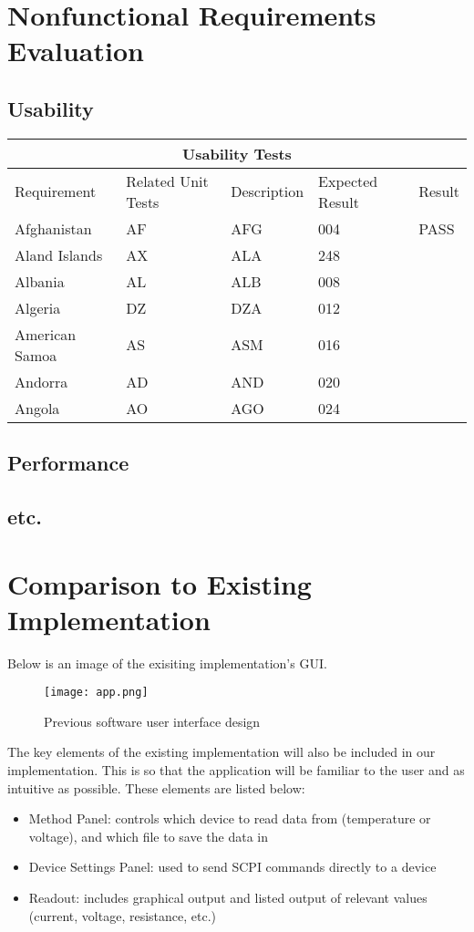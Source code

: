 \documentclass[12pt, titlepage]{article}
\begin{document}
\section{Nonfunctional Requirements Evaluation}

\subsection{Usability}
\begin{tabular}{ |p{3cm}||p{3cm}|p{3cm}|p{3cm}|p{2cm}| }
  \hline
  \multicolumn{5}{|c|}{Usability Tests} \\
  \hline
  Requirement & Related Unit Tests & Description & Expected Result & Result\\
  \hline
  Afghanistan   & AF    &AFG&   004 & PASS\\
  Aland Islands&   AX  & ALA   &248 &\\
  Albania &AL & ALB&  008 &\\
  Algeria    &DZ & DZA&  012 &\\
  American Samoa&   AS  & ASM&016 &\\
  Andorra& AD  & AND   &020 &\\
  Angola& AO  & AGO&024 &\\
  \hline
 \end{tabular}
		
\subsection{Performance}

\subsection{etc.}
	

\section{Comparison to Existing Implementation}	

\noindent Below is an image of the exisiting implementation's GUI.

\begin{figure}[H]
\centerline{\texttt{[image: app.png]}}
\caption{Previous software user interface design}
\label{fig}
\end{figure}

\noindent The key elements of the existing implementation will also be included in our implementation. This is so that the application will be familiar to the user and as intuitive as possible. These elements are listed below:
\begin{itemize}
  \item Method Panel: controls which device to read data from (temperature or voltage), and which file to save the data in
  \item Device Settings Panel: used to send SCPI commands directly to a device
  \item Readout: includes graphical output and listed output of relevant values (current, voltage, resistance, etc.)
\end{itemize}
\end{document}
